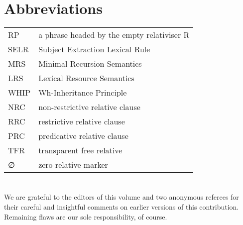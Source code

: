 \documentclass[output=paper
 	        ,biblatex
                ,babelshorthands
                ,newtxmath
                ,draftmode
                ,colorlinks, citecolor=brown
]{langscibook}
\begin{document}

\section*{Abbreviations}

\begin{tabularx}{.99\textwidth}{@{}lX}
RP & a phrase headed by the empty relativiser R\\
SELR & Subject Extraction Lexical Rule         \\            
MRS & Minimal Recursion Semantics              \\            
LRS & Lexical Resource Semantics               \\            
WHIP &  Wh-Inheritance Principle                \\             
NRC & non-restrictive relative clause           \\             
RRC & restrictive relative clause               \\             
PRC & predicative relative clause               \\             
TFR & transparent free relative                 \\             
∅   & zero relative marker
\end{tabularx}





\section*{\acknowledgmentsEN}

We are grateful to the editors of this volume and two anonymous referees for their careful
and insightful comments on earlier versions of this contribution. Remaining flaws are our
sole responsibility, of course.


{\sloppy 
\printbibliography[heading=subbibliography,notkeyword=this] 
}
\end{document}
